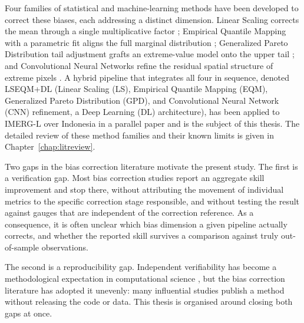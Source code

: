 Four families of statistical and machine-learning methods have
been developed to correct these biases, each addressing a
distinct dimension. Linear Scaling corrects the mean through a
single multiplicative factor \citep{ref:teutschbein2012};
Empirical Quantile Mapping with a parametric fit aligns the full
marginal distribution \citep{ref:gudmundsson2012, ref:themessl2012};
Generalized Pareto Distribution tail adjustment grafts an
extreme-value model onto the upper tail \citep{ref:coles2001};
and Convolutional Neural Networks refine the residual spatial
structure of extreme pixels \citep{ref:pan2019, ref:banomedina2020}.
A hybrid pipeline that integrates all four in sequence, denoted
LSEQM+DL (Linear Scaling (LS), Empirical Quantile Mapping (EQM), 
Generalized Pareto Distribution (GPD), and Convolutional Neural Network 
(CNN) refinement, a Deep Learning (DL) architecture), has been applied 
to IMERG-L over Indonesia in a parallel paper \citep{ref:istanto2026mdpi}\MDPIstatus 
and is the subject of this thesis. The detailed review of these method
families and their known limits is given in
Chapter~\ref{chap:litreview}.

Two gaps in the bias correction literature motivate the present
study. The first is a verification gap. Most bias correction
studies report an aggregate skill improvement and stop there,
without attributing the movement of individual metrics to the
specific correction stage responsible, and without testing the
result against gauges that are independent of the correction
reference. As a consequence, it is often unclear which bias
dimension a given pipeline actually corrects, and whether the
reported skill survives a comparison against truly out-of-sample
observations.

The second is a reproducibility gap. Independent verifiability has
become a methodological expectation in computational science
\citep{ref:peng2011, ref:stodden2014, ref:wilkinson2016}, but the
bias correction literature has adopted it unevenly: many
influential studies publish a method without releasing the code
or data. This thesis is organised around closing both gaps at
once.


